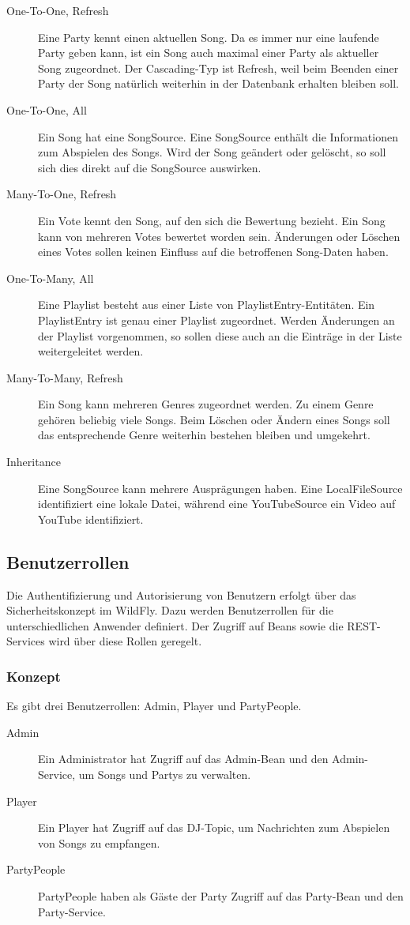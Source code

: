\begin{description}
	\item[One-To-One, Refresh] Eine Party kennt einen aktuellen Song. Da es immer nur eine laufende Party geben kann, ist ein Song auch maximal einer Party als aktueller Song zugeordnet. Der Cascading-Typ ist Refresh, weil beim Beenden einer Party der Song natürlich weiterhin in der Datenbank erhalten bleiben soll.
	\item[One-To-One, All] Ein Song hat eine SongSource. Eine SongSource enthält die Informationen zum Abspielen des Songs. Wird der Song geändert oder gelöscht, so soll sich dies direkt auf die SongSource auswirken.
	\item[Many-To-One, Refresh] Ein Vote kennt den Song, auf den sich die Bewertung bezieht. Ein Song kann von mehreren Votes bewertet worden sein. Änderungen oder Löschen eines Votes sollen keinen Einfluss auf die betroffenen Song-Daten haben.
	\item[One-To-Many, All] Eine Playlist besteht aus einer Liste von PlaylistEntry-Entitäten. Ein PlaylistEntry ist genau einer Playlist zugeordnet. Werden Änderungen an der Playlist vorgenommen, so sollen diese auch an die Einträge
	in der Liste weitergeleitet werden.
	\item[Many-To-Many, Refresh] Ein Song kann mehreren Genres zugeordnet werden. Zu einem Genre gehören beliebig viele Songs. Beim Löschen oder Ändern eines Songs soll das entsprechende Genre weiterhin bestehen bleiben und umgekehrt.
	\item[Inheritance] Eine SongSource kann mehrere Ausprägungen haben. Eine LocalFileSource identifiziert eine lokale Datei, während eine YouTubeSource ein Video auf YouTube identifiziert.
\end{description}



\subsection{Benutzerrollen}
\label{sec:Benutzerrollen}
Die Authentifizierung und Autorisierung von Benutzern erfolgt über das Sicherheitskonzept im WildFly. Dazu werden Benutzerrollen für die unterschiedlichen Anwender definiert. Der Zugriff auf Beans sowie die REST-Services wird über diese Rollen geregelt. 

\subsubsection{Konzept}
Es gibt drei Benutzerrollen: Admin, Player und PartyPeople.
\begin{description}
	\item[Admin] Ein Administrator hat Zugriff auf das Admin-Bean und den Admin-Service, um Songs und Partys zu verwalten.
	\item[Player] Ein Player hat Zugriff auf das DJ-Topic, um Nachrichten zum Abspielen von Songs zu empfangen.
	\item[PartyPeople] PartyPeople haben als Gäste der Party Zugriff auf das Party-Bean und den Party-Service.
\end{description}

